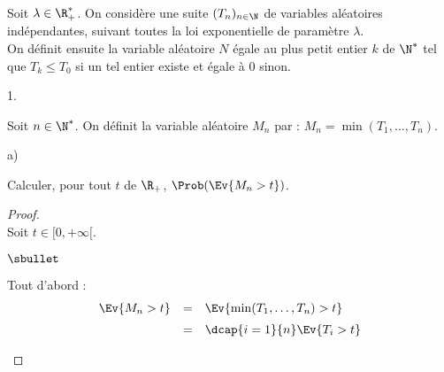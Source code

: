 \documentclass[11pt]{article}%
\begin{document}
\noindent %
Soit $\lambda \in \R_+^*$. On considère une suite $(T_n)_{n \in \N}$
de variables aléatoires indépendantes, suivant toutes la loi
exponentielle de paramètre $\lambda$.\\
On définit ensuite la variable aléatoire $N$ égale au plus petit
entier $k$ de $\N^*$ tel que $T_k \leq T_0$ si un tel entier existe et
égale à $0$ sinon.
\begin{noliste}{1.}
  \setlength{\itemsep}{4mm}
  \setcounter{enumi}{3}
\item Soit $n \in \N^*$. On définit la variable aléatoire $M_n$ par :
  $M_n  = \min(T_1, \ldots, T_n)$.
  \begin{noliste}{a)}
    \setlength{\itemsep}{2mm}
  \item Calculer, pour tout $t$ de $\R_+$, $\Prob(\Ev{M_n > t})$.
    \begin{proof}~\\
      Soit $t \in [0,+\infty[$.
      \begin{noliste}{$\sbullet$}
      \item Tout d'abord :
        \[
          \begin{array}{rcl}
            \Ev{M_n >t}
            & = & \Ev{\min(T_1, \ldots, T_n) > t}
            \\[.2cm]
            & = & \dcap{i=1}{n} \Ev{T_i > t}
          \end{array}
        \]


        \newpage
        

\end{noliste}
\end{proof}
\end{noliste}
\end{noliste}
\end{document}
